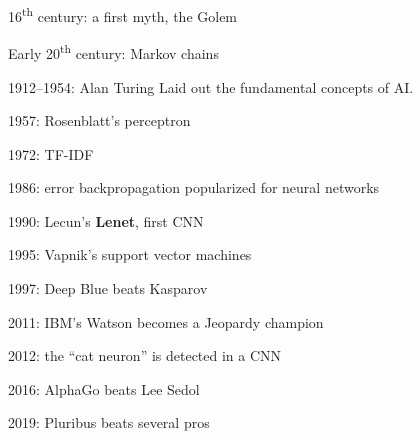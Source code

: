 \begin{frame}{16\textsuperscript{th} century: a first myth, the Golem}
\end{frame}

\begin{frame}{Early 20\textsuperscript{th} century: Markov chains}
\end{frame}

\begin{frame}{1912--1954: Alan Turing}
  Laid out the fundamental concepts of AI.
\end{frame}

\begin{frame}{1957: Rosenblatt's perceptron}
\end{frame}

\begin{frame}{1972: TF-IDF}
\end{frame}

\begin{frame}{1986: error backpropagation popularized for neural networks}
\end{frame}

\begin{frame}{1990: Lecun's \textbf{Lenet}, first CNN}
\end{frame}

\begin{frame}{1995: Vapnik's support vector machines}
\end{frame}

\begin{frame}{1997: Deep Blue beats Kasparov}
\end{frame}

\begin{frame}{2011: IBM's Watson becomes a Jeopardy champion}
\end{frame}

\begin{frame}{2012: the “cat neuron” is detected in a CNN}
\end{frame}

\begin{frame}{2016: AlphaGo beats Lee Sedol}
\end{frame}

\begin{frame}{2019: Pluribus beats several pros}
\end{frame}
